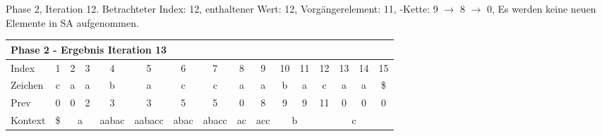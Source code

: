 \begin{table}[H]
\caption[Phase 2, Iteration 12]{Phase 2, Iteration 12. Betrachteter Index: 12, enthaltener Wert: 12, Vorgängerelement: 11, \prevpointer-Kette: 9 $\rightarrow$ 8 $\rightarrow$ 0, Es werden keine neuen Elemente in SA aufgenommen.}
\label{table_complex_example_2_12} 
\end{table}

\begin{table}[H]
\centering
\begin{adjustbox}{max width=\textwidth}
\centering
\begin{tabular}{lccccccccccccccc}
\multicolumn{16}{l}{Phase 2 - Ergebnis Iteration 13}                                                                                                                                                                                                                                                                                                            \\ \hline
\multicolumn{1}{l|}{Index}   & 1                       & 2  & 3                       & 4                          & 5                           & 6                         & 7                          & 8                       & 9                        & 10 & 11                      & 12 & 13                        & 14 & 15                        \\
\multicolumn{1}{l|}{Zeichen} & c                       & a  & a                       & b                          & a                           & c                         & c                          & a                       & a                        & b  & a                       & c  & a                         & a  & \$                        \\
\multicolumn{1}{l|}{Prev}    & 0                       & 0  & 2                       & 3                          & 3                           & 5                         & 5                          & 0                       & 8                        & 9  & 9                       & 11 & 0                         & 0  & 0                         \\ \hline
\multicolumn{1}{l|}{Kontext} & \multicolumn{1}{c|}{\$} & \multicolumn{2}{c|}{a}       & \multicolumn{1}{c|}{aabac} & \multicolumn{1}{c|}{aabacc} & \multicolumn{1}{c|}{abac} & \multicolumn{1}{c|}{abacc} & \multicolumn{1}{c|}{ac} & \multicolumn{1}{c|}{acc} & \multicolumn{2}{c|}{b}       & \multicolumn{4}{c}{c}                                           \\

\end{tabular}
\end{adjustbox}
\end{table}
